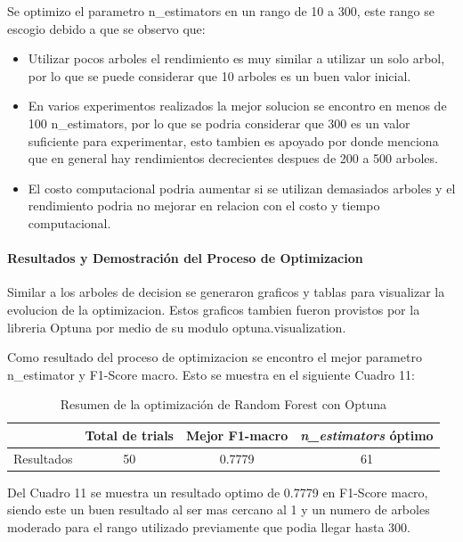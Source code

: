 \documentclass[12pt,a4paper]{article}
\begin{document}
Se optimizo el parametro n_estimators en un rango de 10 a 300, este rango se escogio debido a que se observo que:
\begin{itemize}
  \item Utilizar pocos arboles el rendimiento es muy similar a utilizar un solo arbol,
    por lo que se puede considerar que 10 arboles es un buen valor inicial.
  \item En varios experimentos realizados la mejor solucion se encontro en menos de 100 n_estimators,
    por lo que se podria considerar que 300 es un valor suficiente para experimentar, esto tambien es apoyado por
    \autocite{probstHyperparametersTuningStrategies2019} donde menciona que en general hay
    rendimientos decrecientes despues de 200 a 500 arboles.
  \item El costo computacional podria aumentar si se utilizan demasiados arboles y el rendimiento podria no mejorar
    en relacion con el costo y tiempo computacional.
\end{itemize}

\paragraph{Resultados y Demostración del Proceso de Optimizacion}

Similar a los arboles de decision se generaron graficos y tablas para visualizar la evolucion de la optimizacion.
Estos graficos tambien fueron provistos por la libreria Optuna por medio de su modulo optuna.visualization.

Como resultado del proceso de optimizacion se encontro el mejor parametro n_estimator y F1-Score macro.
Esto se muestra en el siguiente Cuadro 11:

\begin{table}[htbp]
  \centering
  \begin{tabular}{lccc}
    \hline
    & Total de trials & Mejor F1-macro & \textit{n\_estimators} óptimo \\
    \hline
    Resultados & 50 & 0.7779 & 61 \\
    \hline
  \end{tabular}
  \caption{Resumen de la optimización de Random Forest con Optuna}
  \label{tab:optuna-rf-resumen}
\end{table}

Del Cuadro 11 se muestra un resultado optimo de 0.7779 en F1-Score macro, siendo este un buen resultado al ser mas cercano al 1
y un numero de arboles moderado para el rango utilizado previamente que podia llegar hasta 300.
\end{document}

